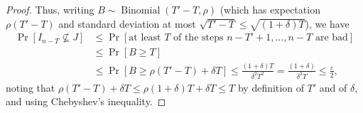 \documentclass[10pt,a4paper]{amsart}
\newcommand{\on}{\operatorname}
\begin{document}
\begin{proof}
Thus, writing $B\sim\on{Binomial}(T'-T,\rho)$ (which has expectation $\rho(T'-T)$ and standard deviation at
most $\sqrt{T'-T}\le \sqrt{(1+\delta)T}$), we have
\begin{align*}
\Pr[I_{n-T}\not\subseteq J] & \le\Pr[\text{at least }T\text{ of the steps }n-T'+1,\dots,n-T\text{ are bad}]\\
 & \le\Pr[B\ge T]\\
 & \le\Pr[B\ge\rho(T'-T)+\delta T]\le\frac{(1+\delta)T}{\delta^2 T^2}=\frac{(1+\delta)}{\delta^2 T}\le \frac{\varepsilon}{2},
\end{align*}
noting that $\rho(T'-T)+\delta T\le \rho(1+\delta) T+\delta T\le T$ by definition of $T'$ and of $\delta$, and using Chebyshev's inequality.
\end{proof}
\end{document}
